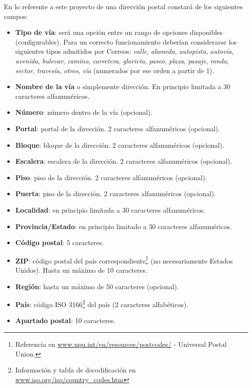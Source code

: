 \documentclass[11pt, a4paper, twoside, titlepage]{article}
\begin{document}
					\label{srs:direccionpostal}		
					En lo referente a este proyecto de \software una dirección postal constará de los siguientes campos:
					\begin{itemize}
						\item \textbf{Tipo de vía}: será una opción entre un rango de opciones disponibles (configurables). Para un correcto funcionamiento deberían considerarse los siguientes tipos admitidos por Correos: \textit{calle}, \textit{alameda}, \textit{autopista}, \textit{autovía}, \textit{avenida}, \textit{bulevar}, \textit{camino}, \textit{carretera}, \textit{glorieta}, \textit{paseo}, \textit{plaza}, \textit{pasaje}, \textit{ronda}, \textit{sector}, \textit{travesía}, \textit{otros}, \textit{vía} (numerados por ese orden a partir de 1).
						\item \textbf{Nombre de la vía} o simplemente dirección. En principio limitada a 30 caracteres alfanuméricos.
						\item \textbf{Número}: número dentro de la vía (opcional).
						\item \textbf{Portal}: portal de la dirección. 2 caracteres alfanuméricos (opcional).
						\item \textbf{Bloque}: bloque de la dirección. 2 caracteres alfanuméricos (opcional).
						\item \textbf{Escalera}: escalera de la dirección. 2 caracteres alfanuméricos (opcional).
						\item \textbf{Piso}: piso de la dirección. 2 caracteres alfanuméricos (opcional).
						\item \textbf{Puerta}: piso de la dirección. 2 caracteres alfanuméricos (opcional).
						\item \textbf{Localidad}: en principio limitada a 30 caracteres alfanuméricos.
						\item \textbf{Provincia/Estado}: en principio limitado a 30 caracteres alfanuméricos.
						\item \textbf{Código postal}: 5 caracteres.
						\item \textbf{ZIP}: código postal del país correspondiente\footnote{Referencia en \url{www.upu.int/en/resources/postcodes/} - Universal Postal Union.} (no necesariamente Estados Unidos). Hasta un máximo de 10 caracteres.
						\item \textbf{Región}: hasta un máximo de 50 caracteres (opcional).
						\item \textbf{País}: código ISO 3166\footnote{Información y tabla de decodificación en \url{www.iso.org/iso/country_codes.htm}} del país (2 caracteres alfabéticos).
						\item \textbf{Apartado postal}: 10 caracteres.
					\end{itemize}
\end{document}
